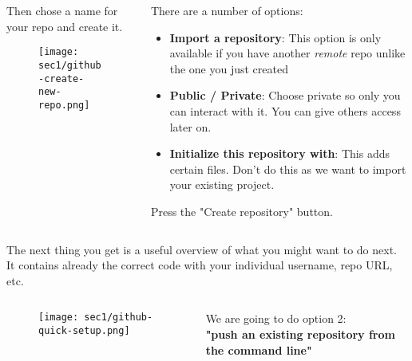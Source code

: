 \begin{frame}[fragile]
\emptyframetitle

  \begin{columns}

    \begin{column}{0.5\textwidth}
      Then chose a name for your repo and create it.
      \begin{figure}[h]
        \texttt{[image: sec1/github-create-new-repo.png]}
      \end{figure}
    \end{column}

    \begin{column}{0.5\textwidth}
      There are a number of options:
      \begin{itemize}
        \item \textbf{Import a repository}: This option is only available if you have another \textit{remote} repo unlike the one you just created
        \item \textbf{Public / Private}: Choose private so only you can interact with it. You can give others access later on.
        \item \textbf{Initialize this repository with}: This adds certain files. Don't do this as we want to import your existing project.
      \end{itemize}
   
\vspace*{0.25cm}   Press the "Create repository" button.
    \end{column}
  \end{columns}

\end{frame}

\begin{frame}[fragile]
\emptyframetitle

  The next thing you get is a useful overview of what you might want to do next. It contains already the correct code with your individual username, repo URL, etc.

  \begin{columns}
  \begin{column}{0.6\textwidth}
    \begin{figure}[h]
      \texttt{[image: sec1/github-quick-setup.png]}
    \end{figure}
  \end{column}
  \begin{column}{0.4\textwidth}
    \vspace*{3.25cm}
    We are going to do option 2:\\ \textbf{"push an existing repository from the command line"}
  \end{column}
  \end{columns}

\end{frame}


